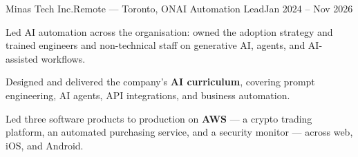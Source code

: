 \begin{cvjob}{Minas Tech Inc.}{Remote --- Toronto, ON}{AI Automation Lead}{Jan 2024 -- Nov 2026}
  \item Led AI automation across the organisation: owned the adoption strategy and trained engineers and non-technical staff on generative AI, agents, and AI-assisted workflows.
  \item Designed and delivered the company's \textbf{AI curriculum}, covering prompt engineering, AI agents, API integrations, and business automation.
  \item Led three software products to production on \textbf{AWS} --- a crypto trading platform, an automated purchasing service, and a security monitor --- across web, iOS, and Android.
\end{cvjob}

